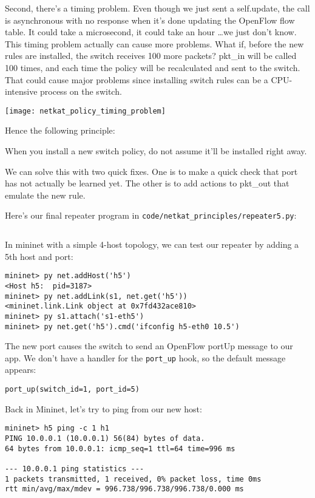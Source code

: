 Second, there's a timing problem.
Even though we just sent a self.update, the call is asynchronous with no response when it's done updating the
OpenFlow flow table.  It could take a microsecond, it could take an hour \ldots we just don't know.  
This timing problem actually can cause more problems.  What if, before the new rules are installed, the 
switch receives 100 more packets?  pkt\_in will be called 100 times, and each time the policy will
be recalculated and sent to the switch.  That could cause major problems since installing switch rules can
be a CPU-intensive process on the switch.

\texttt{[image: netkat\_policy\_timing\_problem]}

Hence the following principle:

\begin{principle}
When you install a new switch policy, do not assume it'll be installed right away.  
\end{principle}

We can solve this with two quick fixes.  One is to make a quick check that port has not actually be learned yet.
The other is to add actions to pkt\_out that emulate the new rule.  

Here's our final repeater program in \texttt{code/netkat\_principles/repeater5.py}:

\inputminted{python}{code/netkat_principles/repeater5.py}

In mininet with a simple 4-host topology, we can test our repeater by adding a 5th host and port:

\begin{verbatim}
mininet> py net.addHost('h5')
<Host h5:  pid=3187>
mininet> py net.addLink(s1, net.get('h5'))
<mininet.link.Link object at 0x7fd432ace810>
mininet> py s1.attach('s1-eth5')
mininet> py net.get('h5').cmd('ifconfig h5-eth0 10.5')
\end{verbatim}

The new port causes the switch to send an OpenFlow portUp message to our app.  We don't have a handler for
the \texttt{port\_up} hook, so the default message appears:

\begin{verbatim}
port_up(switch_id=1, port_id=5)
\end{verbatim}

Back in Mininet, let's try to ping from our new host:

\begin{verbatim}
mininet> h5 ping -c 1 h1
PING 10.0.0.1 (10.0.0.1) 56(84) bytes of data.
64 bytes from 10.0.0.1: icmp_seq=1 ttl=64 time=996 ms

--- 10.0.0.1 ping statistics ---
1 packets transmitted, 1 received, 0% packet loss, time 0ms
rtt min/avg/max/mdev = 996.738/996.738/996.738/0.000 ms
\end{verbatim}

